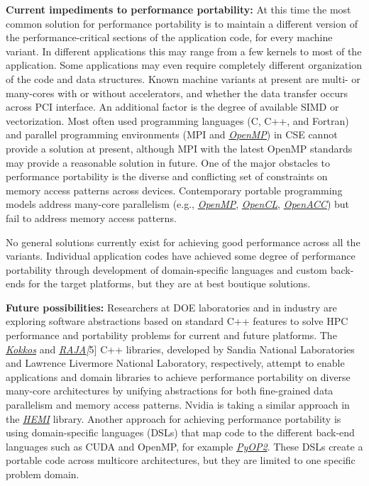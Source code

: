 \documentclass[]{article}
\begin{document}
\textbf{Current impediments to performance portability:} At this time
the most common solution for performance portability is to maintain a
different version of the performance-critical sections of the
application code, for every machine variant. In different applications
this may range from a few kernels to most of the application. Some
applications may even require completely different organization of the
code and data structures. Known machine variants at present are multi-
or many-cores with or without accelerators, and whether the data
transfer occurs across PCI interface. An additional factor is the degree
of available SIMD or vectorization. Most often used programming
languages (C, C++, and Fortran) and parallel programming environments
(MPI and \href{http://openmp.org/wp/}{\emph{OpenMP}}) in CSE cannot
provide a solution at present, although MPI with the latest OpenMP
standards may provide a reasonable solution in future. One of the major
obstacles to performance portability is the diverse and conflicting set
of constraints on memory access patterns across devices. Contemporary
portable programming models address many-core parallelism (e.g.,
\href{http://openmp.org/wp/}{\emph{OpenMP}},
\href{https://www.khronos.org/opencl/}{\emph{OpenCL}},
\href{http://www.openacc.org}{\emph{OpenACC}}) but fail to address
memory access patterns.

No general solutions currently exist for achieving good performance
across all the variants. Individual application codes have achieved some
degree of performance portability through development of domain-specific
languages and custom back-ends for the target platforms, but they are at
best boutique solutions.

\textbf{Future possibilities:} Researchers at DOE laboratories and in
industry are exploring software abstractions based on standard C++
features to solve HPC performance and portability problems for current
and future platforms. The
\href{http://www.sciencedirect.com/science/article/pii/S0743731514001257}{\emph{Kokkos}}
and
\href{https://e-reports-ext.llnl.gov/pdf/782261.pdf}{\emph{RAJA{[}}}5{]}
C++ libraries, developed by Sandia National Laboratories and Lawrence
Livermore National Laboratory, respectively, attempt to enable
applications and domain libraries to achieve performance portability on
diverse many-core architectures by unifying abstractions for both
fine-grained data parallelism and memory access patterns. Nvidia is
taking a similar approach in the
\href{https://github.com/harrism/hemi}{\emph{HEMI}} library. Another
approach for achieving performance portability is using domain-specific
languages (DSLs) that map code to the different back-end languages such
as CUDA and OpenMP, for example
\href{http://ieeexplore.ieee.org/xpl/login.jsp?tp=\&arnumber=6495916\&url=http\%3A\%2F\%2Fieeexplore.ieee.org\%2Fxpls\%2Fabs_all.jsp\%3Farnumber\%3D6495916}{\emph{PyOP2}}.
These DSLs create a portable code across multicore architectures, but
they are limited to one specific problem domain.
\end{document}
